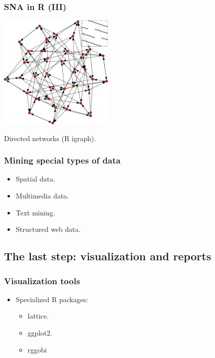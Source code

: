 \begin{frame}
\frametitle{SNA in R (III)}

\begin{center}
 \includegraphics[height=5.5cm]{figs/sna3-igraph.png}
\end{center}

\begin{flushright}
\small Directed networks (R igraph).
\end{flushright}

\end{frame}


\begin{frame}
\frametitle{Mining special types of data}

\begin{itemize}
 \item Spatial data.
 \item Multimedia data.
 \item Text mining.
 \item Structured web data.
\end{itemize}


\end{frame}

\subsection{The last step: visualization and reports}


\begin{frame}
\frametitle{Visualization tools}

\begin{itemize}
 \item Specialized R packages:
 \begin{itemize}
  \item lattice.
  \item ggplot2.
  \item rggobi
 \end{itemize}

\end{itemize}

\end{frame}

